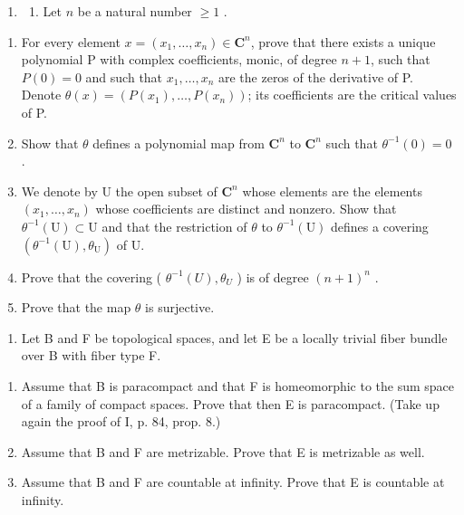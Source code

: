 \begin{enumerate}
\def\labelenumi{\arabic{enumi})}
\setcounter{enumi}{7}
\tightlist
\item
  \begin{enumerate}
  \def\labelenumii{(\arabic{enumii})}
  \setcounter{enumii}{1}
  \tightlist
  \item
    Let \(n\) be a natural number \(\geqslant 1\) .
  \end{enumerate}
\end{enumerate}

\begin{enumerate}
\def\labelenumi{\alph{enumi})}
\item
  For every element \(x=(x_{1},\ldots,x_{n})\in\mathbf{C}^{n}\), prove that there exists a unique polynomial P with complex coefficients, monic, of degree \(n+1\), such that \(P(0)=0\) and such that \(x_{1},\ldots,x_{n}\) are the zeros of the derivative of P. Denote \(\theta(x)=(P(x_{1}),\ldots,P(x_{n}))\); its coefficients are the critical values of P.
\item
  Show that \(\theta\) defines a polynomial map from \(\mathbf{C}^n\) to \(\mathbf{C}^n\) such that \(\theta^{-1}(0) = 0\) .
\item
  We denote by U the open subset of \(\mathbf{C}^{n}\) whose elements are the elements \((x_{1},\ldots,x_{n})\) whose coefficients are distinct and nonzero. Show that \(\theta^{-1}\left(\mathrm{U}\right)\subset\mathrm{U}\) and that the restriction of \(\theta\) to \(\theta^{-1}\left(\mathrm{U}\right)\) defines a covering \((\theta^{-1}\left(\mathrm{U}\right),\theta_{\mathrm{U}})\) of U.
\item
  Prove that the covering ( \(\theta^{-1}(U),\theta_{U}\) ) is of degree \((n+1)^{n}\) .
\item
  Prove that the map \(\theta\) is surjective.
\end{enumerate}

\begin{enumerate}
\def\labelenumi{\arabic{enumi})}
\setcounter{enumi}{8}
\tightlist
\item
  Let B and F be topological spaces, and let E be a locally trivial fiber bundle over B with fiber type F.
\end{enumerate}

\begin{enumerate}
\def\labelenumi{\alph{enumi})}
\item
  Assume that B is paracompact and that F is homeomorphic to the sum space of a family of compact spaces. Prove that then E is paracompact. (Take up again the proof of I, p. 84, prop. 8.)
\item
  Assume that B and F are metrizable. Prove that E is metrizable as well.
\item
  Assume that B and F are countable at infinity. Prove that E is countable at infinity.
\end{enumerate}

